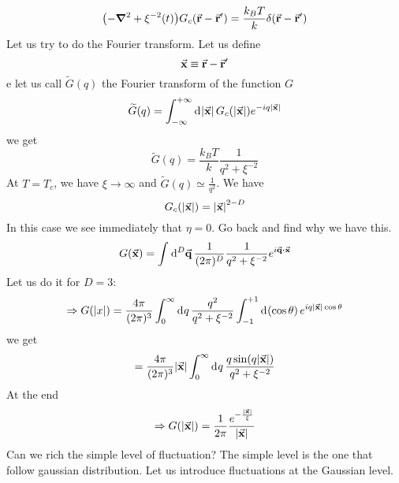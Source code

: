 \documentclass[../main/main.tex]{subfiles}
\begin{document}

\begin{equation}
  \qty(- \grad ^2 + \xi ^{-2} (t)) G_c (\va{r}-\va{r}') = \frac{k_B T}{k} \delta (\va{r}-\va{r}')
\end{equation}
Let us try to do the Fourier transform.
Let us define
\begin{equation}
  \va{x} \equiv \va{r} - \va{r}'
\end{equation}
e let us call \( \widetilde{G} (q)  \) the Fourier transform of the function \( G \)
\begin{equation}
  \widetilde{G} (q) = \int_{- \infty }^{+ \infty } \dd[]{\abs{\va{x}} } G_c ( \abs{\va{x}} ) e^{- i q \abs{\va{x}} }
\end{equation}
we get
\begin{equation}
  \widetilde{G} ( q ) = \frac{k_B T}{k} \frac{1}{q^2 + \xi ^{-2}}
\end{equation}
At \( T = T_c \), we have  \( \xi \rightarrow \infty  \)  and \( \widetilde{G} (q) \simeq \frac{1}{q^2}  \).
We have
\begin{equation}
  G_c (\abs{\va{x}} ) = \abs{\va{x}}^{2-D}
\end{equation}
In this case we see immediately that \( \eta = 0 \). Go back and find why we have this.
\begin{equation}
  G (\va{x}) = \int_{}^{} \dd[D]{\va{q}}  \frac{1}{(2 \pi )^D} \frac{1}{q^2 + \xi ^{-2}} e^{i \va{q} \vdot \va{x}}
\end{equation}
Let us do it for \( D=3 \):
\begin{equation}
  \Rightarrow G(\abs{x} ) = \frac{4 \pi }{ (2 \pi )^3} \int_{0}^{\infty } \dd[]{q} \frac{q^2}{q^2+ \xi ^{-2}} \int_{-1}^{+1} \dd[]{(\cos \theta  )}    e^{i q \abs{\va{x}} \cos \theta  }
\end{equation}
we get
\begin{equation}
  = \frac{4 \pi }{ (2 \pi )^3} \abs{\va{x}} \int_{0}^{\infty } \dd[]{q} \frac{q \sin(q \abs{\va{x}} ) }{q^2 + \xi ^{-2}}
\end{equation}
At the end
\begin{equation}
  \Rightarrow G ( \abs{\va{x}} ) = \frac{1}{2 \pi } \frac{e^{- \frac{\abs{\va{x}} }{\xi }} }{\abs{\va{x}} }
\end{equation}
Can we rich the simple level of fluctuation? The simple level is the one that follow gaussian distribution.
Let us introduce fluctuations at the Gaussian level.
\end{document}
